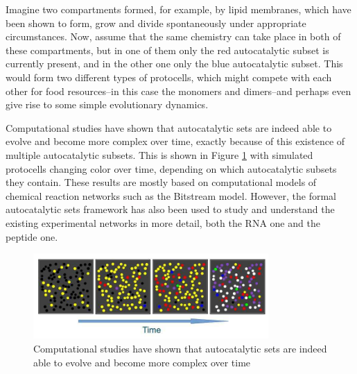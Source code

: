 \documentclass[]{article}
\begin{document}
Imagine two compartments formed,
for example, by lipid membranes,
which have been shown to form,
grow and divide spontaneously
under appropriate circumstances.
Now, assume that
the same chemistry can take place
in both of these compartments,
but in one of them
only the red autocatalytic subset
is currently present,
and in the other one
only the blue autocatalytic subset.
This would form two different types of protocells, which might compete with each other
for food resources--in this case the monomers and dimers--and perhaps even give rise to
some simple evolutionary dynamics.



Computational studies have shown
that autocatalytic sets
are indeed able to evolve
and become more complex over time,
exactly because of this existence
of multiple autocatalytic subsets.
This is shown in Figure \ref{fig:EvolveableProtocells} with simulated
protocells changing color over time,
depending on which autocatalytic
subsets they contain.
These results are mostly based on
computational models
of chemical reaction networks
such as the Bitstream model.
However, the formal autocatalytic
sets framework
has also been used to study
and understand
the existing experimental networks
in more detail,
both the RNA one and the peptide one.

\begin{figure}[H]
	\caption[Computational studies of autocatalytic sets]{Computational studies have shown
		that autocatalytic sets	
		are indeed able to evolve
		and become more complex over time\cite{hordijk2018population}}\label{fig:EvolveableProtocells}
	\includegraphics[width=0.8\textwidth]{EvolveableProtocells}
\end{figure}
\end{document}
